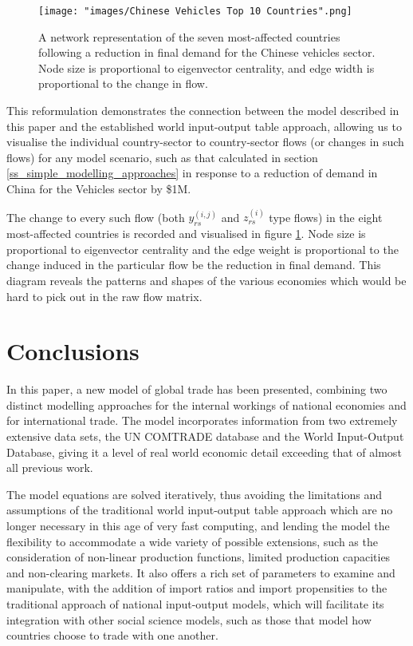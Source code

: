 \documentclass[a4paper]{article}
\begin{document}
\begin{figure}[tb]
\centering
\texttt{[image: "images/Chinese Vehicles Top 10 Countries".png]}
\caption{A network representation of the seven most-affected countries following a reduction in final demand for the Chinese vehicles sector. Node size is proportional to eigenvector centrality, and edge width is proportional to the change in flow.}\label{fig:chnvehtop6}
\end{figure}

This reformulation demonstrates the connection between the model described in this paper and the established world input-output table approach, allowing us to visualise the individual country-sector to country-sector flows (or changes in such flows) for any model scenario, such as that calculated in section \ref{ss_simple_modelling_approaches} in response to a reduction of demand in China for the Vehicles sector by \$1M.

The change to every such flow (both $y_{rs}^{(i,j)}$ and $z_{rs}^{(i)}$ type flows) in the eight most-affected countries is recorded and visualised in figure \ref{fig:chnvehtop6}.
Node size is proportional to eigenvector centrality and the edge weight is proportional to the change induced in the particular flow be the reduction in final demand.
This diagram reveals the patterns and shapes of the various economies which would be hard to pick out in the raw flow matrix.


\section{Conclusions}\label{sec:conclusions}
In this paper, a new model of global trade has been presented, combining two distinct modelling approaches for the internal workings of national economies and for international trade.
The model incorporates information from two extremely extensive data sets, the UN COMTRADE database and the World Input-Output Database, giving it a level of real world economic detail exceeding that of almost all previous work.

The model equations are solved iteratively, thus avoiding the limitations and assumptions of the traditional world input-output table approach which are no longer necessary in this age of very fast computing, and lending the model the flexibility to accommodate a wide variety of possible extensions, such as the consideration of non-linear production functions, limited production capacities and non-clearing markets.
It also offers a rich set of parameters to examine and manipulate, with the addition of import ratios and import propensities to the traditional approach of national input-output models, which will facilitate its integration with other social science models, such as those that model how countries choose to trade with one another.
\end{document}
